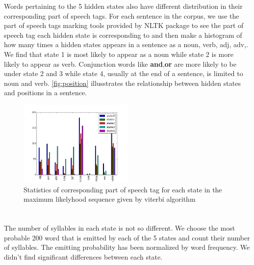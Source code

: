 Words pertaining to the 5 hidden states also have different distribution in their corresponding part of speech tags.  For each sentence in the corpus, we use the part of speech tags marking tools provided by NLTK package to see the part of speech tag each hidden state is corresponding to and then make a histogram of how many times a hidden states appears in a sentence as a noun, verb, adj, adv,. We find that state 1 is most likely to appear as a noun while state 2 is more likely to appear as verb. Conjunction words like \textbf{\‘and\’},\textbf{\’or\’} are more likely to be under state 2 and 3 while state 4, usually at the end of a sentence, is limited to noun and verb. \ref{fig:position} illusstrates the relationship between hidden states and positions in a sentence.
 \begin{figure}[h]
 \centering
 \includegraphics[width=0.5\textwidth]{./figure/hiddenstate_partofspeechtag.png}
 \caption{Statistics of corresponding part of speech tag for each state in the maximum likelyhood sequence given by viterbi algorithm}
 \end{figure}
\paragraph{}
\vspace{35pt}
\section*{}
The number of syllables in each state is not so different. We choose the most probable 200 word that is emitted by each of the 5 states and count their number of syllables. The emitting probability has been normalized by word frequency. We didn’t find significant differences between each state. 


